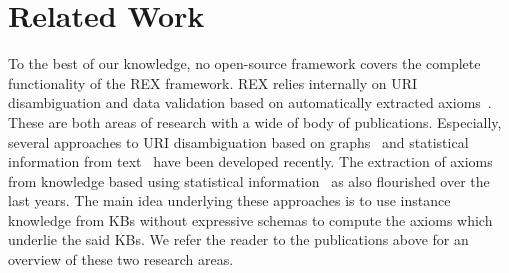 
\section{Related Work}
\label{sec:related}
To the best of our knowledge, no open-source framework covers the complete functionality of the REX framework. 
REX relies internally on URI disambiguation and data validation based on automatically extracted axioms~\cite{Buehmann2012}. 
These are both areas of research with a wide of body of publications. 
Especially, several approaches to URI disambiguation based on graphs~\cite{AIDA,agdistis_iswc} and statistical information from text~\cite{spotlight} have been developed recently. 
The extraction of axioms from knowledge based using statistical information~\cite{Buehmann2012,pattern_enrichment} as also flourished over the last years. 
The main idea underlying these approaches is to use instance knowledge from  \ac{KB}s without expressive schemas to compute the axioms which underlie the said  \ac{KB}s. 
We refer the reader to the publications above for an overview of these two research areas.

